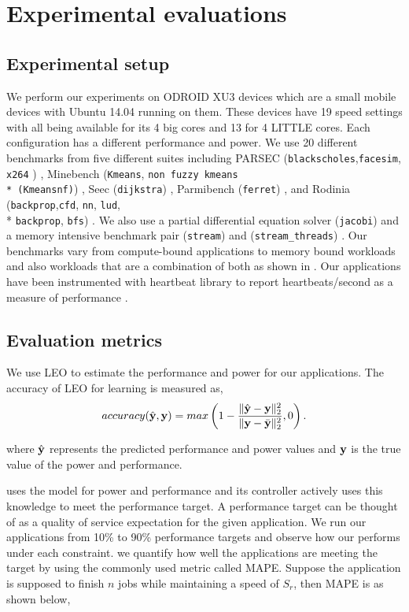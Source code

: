 \section{Experimental evaluations}

\subsection{Experimental setup}

We perform our experiments on ODROID XU3 devices which are a small
mobile devices with Ubuntu 14.04 running on them. These devices have
19 speed settings with all being available for its 4 big cores and 13
for 4 LITTLE cores. Each configuration has a different performance and
power. We use 20 different benchmarks from five different suites
including PARSEC (\texttt{blackscholes},\texttt{facesim},
\texttt{x264} ) \cite{parsec}, Minebench (\texttt{Kmeans}, \texttt{non
  fuzzy kmeans \\* (Kmeansnf)}) \cite{minebench}, Seec
(\texttt{dijkstra}) \cite{seec}, Parmibench (\texttt{ferret})
\cite{parmibench}, and Rodinia
(\texttt{backprop},\texttt{cfd}, \texttt{nn}, \texttt{lud}, \\*
\texttt{backprop}, \texttt{bfs}) \cite{rodinia}.  We also use a
partial differential equation solver (\texttt{jacobi}) and a memory
intensive benchmark pair (\texttt{stream}) and
(\texttt{stream\_threads}) \cite{stream}. Our benchmarks vary from
compute-bound applications to memory bound workloads and also
workloads that are a combination of both as shown in
.  Our applications have been instrumented
with heartbeat library to report heartbeats/second as a measure of
performance \cite{POET}.

\subsection{Evaluation metrics}
We use LEO to estimate the performance and power for our applications.
The accuracy of LEO for learning is measured as,
\begin{equation}
\label{eq:accuracy}
accuracy(\hat{\mathbf{y}},\mathbf{y}) = max\left(1 - \frac{\| \hat{\mathbf{y}}-\mathbf{y} \|^2_2 }{\| \mathbf{y} - \bar{\mathbf{y}}\|^2_2},0\right).
\end{equation}

where $\hat{\mathbf{y}}$ represents the predicted performance and power values
and $\mathbf{y}$ is the true value of the power and performance.

\SYSTEM{} uses the model for power and performance and its controller
actively uses this knowledge to meet the performance target. A
performance target can be thought of as a quality of service
expectation for the given application. We run our applications from
10\% to 90\% performance targets and observe how our \SYSTEM{}
performs under each constraint. we quantify how well the applications
are meeting the target by using the commonly used metric called MAPE.
Suppose the application is supposed to finish $n$ jobs while
maintaining a speed of $S_r$, then MAPE is as shown below,


